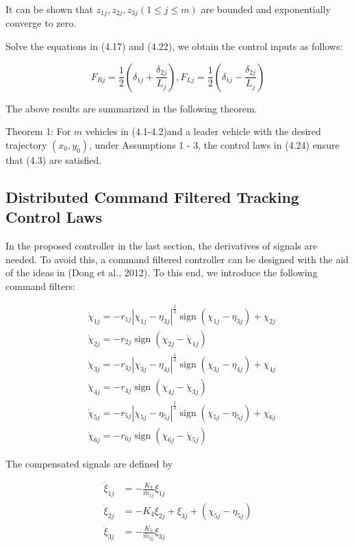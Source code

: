 \documentclass[10pt]{article}
\begin{document}
It can be shown that $z_{1 j}, z_{2 j}, z_{3 j}(1 \leq j \leq m)$ are bounded and exponentially converge to zero.

Solve the equations in (4.17) and (4.22), we obtain the control inputs as follows:

$$
F_{R j}=\frac{1}{2}\left(\delta_{1 j}+\frac{\delta_{2 j}}{L_{j}}\right), F_{L j}=\frac{1}{2}\left(\delta_{1 j}-\frac{\delta_{2 j}}{L_{j}}\right)
$$

The above results are summarized in the following theorem.

Theorem 1: For $m$ vehicles in (4.1-4.2)and a leader vehicle with the desired trajectory $\left(x_{0}, y_{0}\right)$, under Assumptions 1 - 3, the control laws in (4.24) ensure that (4.3) are satisfied.

\subsection{Distributed Command Filtered Tracking Control Laws}
In the proposed controller in the last section, the derivatives of signals are needed. To avoid this, a command filtered controller can be designed with the aid of the ideas in (Dong et al., 2012). To this end, we introduce the following command filters:

$$
\begin{aligned}
& \grave{\chi}_{1 j}=-r_{1 j}\left|\chi_{1 j}-\eta_{3 j}\right|^{\frac{1}{2}} \operatorname{sign}\left(\chi_{1 j}-\eta_{3 j}\right)+\chi_{2 j} \\
& \grave{\chi}_{2 j}=-r_{2 j} \operatorname{sign}\left(\chi_{2 j}-\grave{\chi}_{1 j}\right) \\
& \grave{\chi}_{3 j}=-r_{3 j}\left|\chi_{3 j}-\eta_{4 j}\right|^{\frac{1}{2}} \operatorname{sign}\left(\chi_{3 j}-\eta_{4 j}\right)+\chi_{4 j} \\
& \grave{\chi}_{4 j}=-r_{4 j} \operatorname{sign}\left(\chi_{4 j}-\grave{\chi}_{3 j}\right) \\
& \grave{\chi}_{5 j}=-r_{5 j}\left|\chi_{5 j}-\eta_{5 j}\right|^{\frac{1}{2}} \operatorname{sign}\left(\chi_{5 j}-\eta_{5 j}\right)+\chi_{6 j} \\
& \grave{\chi}_{6 j}=-r_{6 j} \operatorname{sign}\left(\chi_{6 j}-\grave{\chi}_{5 j}\right)
\end{aligned}
$$

The compensated signals are defined by

$$
\begin{array}{ll}
\dot{\xi}_{1 j} & =-\frac{K_{3}}{\bar{m}_{1 j}} \xi_{1 j} \\
\dot{\xi}_{2 j} & =-K_{4} \xi_{2 j}+\xi_{3 j}+\left(\chi_{5 j}-\eta_{5 j}\right) \\
\dot{\xi}_{3 j} & =-\frac{K_{5}}{\bar{m}_{3 j}} \xi_{3 j}
\end{array}
$$
\end{document}
